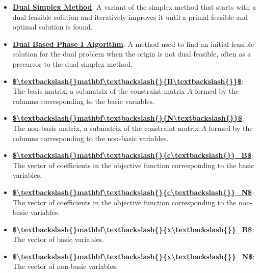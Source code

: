 \documentclass{article}%
\begin{document}
\begin{itemize}[leftmargin=*]%
\item \href{https://www.math.purdue.edu/~yipn/421/2024-10-03-DualSimplexMatrix.pdf#page=2}{\textbf{Dual Simplex Method}}: A variant of the simplex method that starts with a dual feasible solution and iteratively improves it until a primal feasible and optimal solution is found.%
\item \href{https://www.math.purdue.edu/~yipn/421/2024-10-03-DualSimplexMatrix.pdf#page=5}{\textbf{Dual Based Phase I Algorithm}}: A method used to find an initial feasible solution for the dual problem when the origin is not dual feasible, often as a precursor to the dual simplex method.%
\item \href{https://www.math.purdue.edu/~yipn/421/2024-10-03-DualSimplexMatrix.pdf#page=7}{\textbf{\$\textbackslash{}textbackslash\{\}mathbf\textbackslash{}textbackslash\{\}\{B\textbackslash{}textbackslash\{\}\}\$}}: The basis matrix, a submatrix of the constraint matrix $A$ formed by the columns corresponding to the basic variables.%
\item \href{https://www.math.purdue.edu/~yipn/421/2024-10-03-DualSimplexMatrix.pdf#page=7}{\textbf{\$\textbackslash{}textbackslash\{\}mathbf\textbackslash{}textbackslash\{\}\{N\textbackslash{}textbackslash\{\}\}\$}}: The non-basis matrix, a submatrix of the constraint matrix $A$ formed by the columns corresponding to the non-basic variables.%
\item \href{https://www.math.purdue.edu/~yipn/421/2024-10-03-DualSimplexMatrix.pdf#page=7}{\textbf{\$\textbackslash{}textbackslash\{\}mathbf\textbackslash{}textbackslash\{\}\{c\textbackslash{}textbackslash\{\}\}\_B\$}}: The vector of coefficients in the objective function corresponding to the basic variables.%
\item \href{https://www.math.purdue.edu/~yipn/421/2024-10-03-DualSimplexMatrix.pdf#page=7}{\textbf{\$\textbackslash{}textbackslash\{\}mathbf\textbackslash{}textbackslash\{\}\{c\textbackslash{}textbackslash\{\}\}\_N\$}}: The vector of coefficients in the objective function corresponding to the non-basic variables.%
\item \href{https://www.math.purdue.edu/~yipn/421/2024-10-03-DualSimplexMatrix.pdf#page=7}{\textbf{\$\textbackslash{}textbackslash\{\}mathbf\textbackslash{}textbackslash\{\}\{x\textbackslash{}textbackslash\{\}\}\_B\$}}: The vector of basic variables.%
\item \href{https://www.math.purdue.edu/~yipn/421/2024-10-03-DualSimplexMatrix.pdf#page=7}{\textbf{\$\textbackslash{}textbackslash\{\}mathbf\textbackslash{}textbackslash\{\}\{x\textbackslash{}textbackslash\{\}\}\_N\$}}: The vector of non-basic variables.%

\end{itemize}
\end{document}
